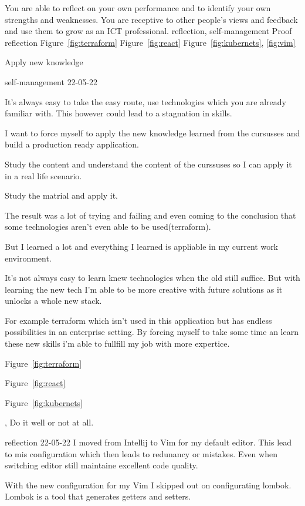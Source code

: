 \competentie
{%
	\competentieformulier
	{%
		You are able to reflect on your own performance and to identify your own strengths and weaknesses. You are receptive to other people's views and feedback and use them to grow as an ICT professional.
	}
	{%
		reflection,%
		self-management%
	}
	{%
		Proof
	}
	{%
		reflection
	}
	{%
		Figure~\ref{fig:terraform}
		Figure~\ref{fig:react}
		Figure~\ref{fig:kubernets},
		\ref{fig:vim}
	}
}
{%
	\bewijs
	{
		Apply new knowledge
	}
	{%
		\starr
		{%
			self-management
		}
		{%
			22-05-22
		}
		{%
			It's always easy to take the easy route, use technologies which you are already familiar with.
			This however could lead to a stagnation in skills.

			I want to force myself to apply the new knowledge learned from the cursusses and build a production ready application.
		}
		{%
			Study the content and understand the content of the curssuses so I can apply it in a real life scenario.
		}
		{%
			Study the matrial and apply it.

		}
		{%
			The result was a lot of trying and failing and even coming to the conclusion that some technologies aren't even able to be used(terraform).

			But I learned a lot and everything I learned is appliable in my current work environment.

		}
		{%
			It's not always easy to learn knew technologies when the old still suffice.
			But with learning the new tech I'm able to be more creative with future solutions as it unlocks a whole new stack.

			For example terraform which isn't used in this application but has endless possibilities in an enterprise setting.
			By forcing myself to take some time an learn these new skills i'm able to fullfill my job with more expertice.
		}
		{

		}
	}
	{%

		Figure~\ref{fig:terraform}

		Figure~\ref{fig:react}

		Figure~\ref{fig:kubernets}
	},
	\bewijs
	{
		Do it well or not at all.
	}
	{%
		\starr
		{%
			reflection
		}
		{%
			22-05-22
		}
		{%
			I moved from Intellij to Vim for my default editor.
			This lead to mis configuration which then leads to redunancy or mistakes.
		}
		{%
			Even when switching editor still maintaine excellent code quality.
		}
		{%
			With the new configuration for my Vim I skipped out on configurating lombok.
			Lombok is a tool that generates getters and setters.


}}}
